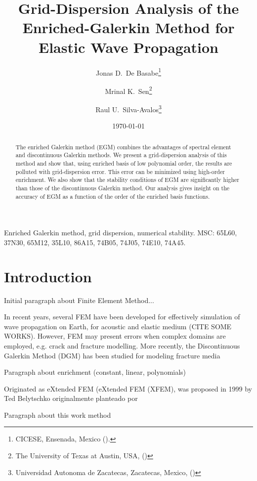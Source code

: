 \documentclass[review,hidelinks,onefignum,onetabnum]{siamart220329}
\title{Grid-Dispersion Analysis of the Enriched-Galerkin Method for Elastic Wave Propagation}
\author{Jonas D.~De Basabe\thanks{CICESE, Ensenada, Mexico 
  (\email{jonas@cicese.mx}).}
\and Mrinal K.~Sen\thanks{The University of Texas at Austin, USA, (\email{mrinal@utexas.edu})}
\and Raul U.~Silva-Avalos\thanks{Universidad Autonoma de Zacatecas, Zacatecas, Mexico, (\email{rsilva@uaz.edu.mx})}
}
\date{\today}
\begin{document}
\maketitle

\begin{abstract}
The enriched Galerkin method (EGM) combines the advantages of spectral element and discontinuous Galerkin methods. 
We present a grid-dispersion analysis of this method and show that, using enriched basis of low polynomial order, the results are polluted with grid-dispersion error. This error can be minimized using high-order enrichment.
We also show that the stability conditions of EGM are significantly higher than those of the discontinuous Galerkin method.
Our analysis gives insight on the accuracy of EGM as a function of the order of the enriched basis functions.
\end{abstract}

\begin{keywords}
Enriched Galerkin method, grid dispersion, numerical stability.
MSC: 65L60, 37N30, 65M12, 35L10, 86A15, 74B05, 74J05, 74E10, 74A45.
\end{keywords}


\section{Introduction}
Initial paragraph about Finite Element Method...

In recent years, several FEM have been developed for effectively simulation of wave propagation on Earth, for acoustic and elastic medium (CITE SOME WORKS). However, FEM may present errors when complex domains are employed, e.g. crack and fracture modelling. More recently, the Discontinuous Galerkin Method (DGM) has been studied for modeling fracture media 

Paragraph about enrichment (constant, linear, polynomials)

Originated as eXtended FEM (eXtended FEM (XFEM), was proposed in 1999 by Ted Belytschko \cite{Belytschko2001}
originalmente planteado por \cite{Sun2009}

Paragraph about this work method
\end{document}
